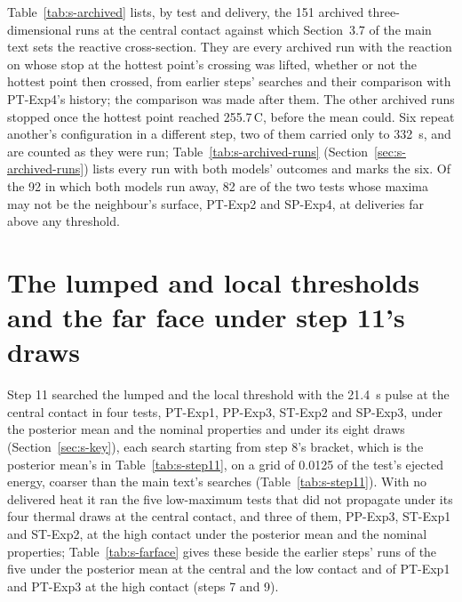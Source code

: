 \documentclass[preprint,12pt]{elsarticle}
\newcommand{\degC}{\,\textdegree C}
\begin{document}
Table~\ref{tab:s-archived} lists, by test and delivery, the 151 archived three-dimensional runs at the central contact against which Section~3.7 of the main text sets the reactive cross-section. They are every archived run with the reaction on whose stop at the hottest point's crossing was lifted, whether or not the hottest point then crossed, from earlier steps' searches and their comparison with PT-Exp4's history; the comparison was made after them. The other archived runs stopped once the hottest point reached 255.7\degC, before the mean could. Six repeat another's configuration in a different step, two of them carried only to 332~s, and are counted as they were run; Table~\ref{tab:s-archived-runs} (Section~\ref{sec:s-archived-runs}) lists every run with both models' outcomes and marks the six. Of the 92 in which both models run away, 82 are of the two tests whose maxima may not be the neighbour's surface, PT-Exp2 and SP-Exp4, at deliveries far above any threshold.



\section{The lumped and local thresholds and the far face under step 11's draws}
\label{sec:s-step11}

Step 11 searched the lumped and the local threshold with the 21.4~s pulse at the central contact in four tests, PT-Exp1, PP-Exp3, ST-Exp2 and SP-Exp3, under the posterior mean and the nominal properties and under its eight draws (Section~\ref{sec:s-key}), each search starting from step 8's bracket, which is the posterior mean's in Table~\ref{tab:s-step11}, on a grid of 0.0125 of the test's ejected energy, coarser than the main text's searches (Table~\ref{tab:s-step11}). With no delivered heat it ran the five low-maximum tests that did not propagate under its four thermal draws at the central contact, and three of them, PP-Exp3, ST-Exp1 and ST-Exp2, at the high contact under the posterior mean and the nominal properties; Table~\ref{tab:s-farface} gives these beside the earlier steps' runs of the five under the posterior mean at the central and the low contact and of PT-Exp1 and PT-Exp3 at the high contact (steps 7 and 9).


\end{document}

